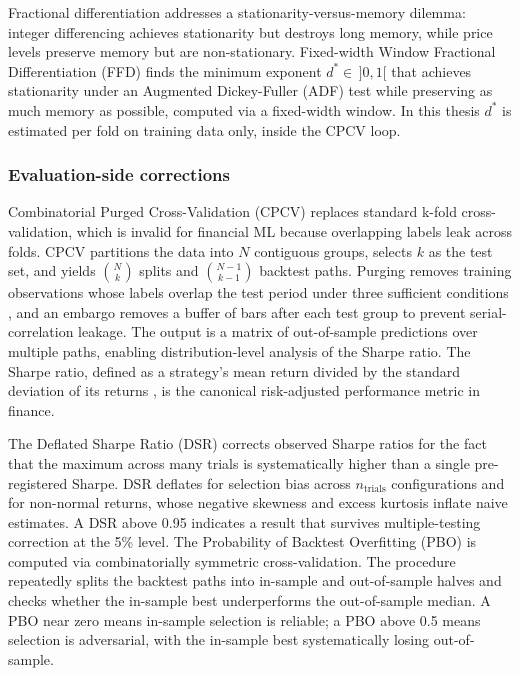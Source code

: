 Fractional differentiation addresses a stationarity-versus-memory dilemma: integer differencing achieves stationarity but destroys long memory, while price levels preserve memory but are non-stationary. Fixed-width Window Fractional Differentiation (FFD) finds the minimum exponent $d^* \in \,]0, 1[$ that achieves stationarity under an Augmented Dickey-Fuller (ADF) test while preserving as much memory as possible, computed via a fixed-width window. In this thesis $d^*$ is estimated per fold on training data only, inside the CPCV loop.


\subsubsection{Evaluation-side corrections}\label{subsubsec:afml_eval_side}

Combinatorial Purged Cross-Validation (CPCV) replaces standard k-fold cross-validation, which is invalid for financial ML because overlapping labels leak across folds. CPCV partitions the data into $N$ contiguous groups, selects $k$ as the test set, and yields $\binom{N}{k}$ splits and $\binom{N-1}{k-1}$ backtest paths. Purging removes training observations whose labels overlap the test period under three sufficient conditions \citep[Ch.~7]{lopez_de_prado_2018}, and an embargo removes a buffer of bars after each test group to prevent serial-correlation leakage. The output is a matrix of out-of-sample predictions over multiple paths, enabling distribution-level analysis of the Sharpe ratio. The Sharpe ratio, defined as a strategy's mean return divided by the standard deviation of its returns \citep{sharpe_1966}, is the canonical risk-adjusted performance metric in finance.

The Deflated Sharpe Ratio (DSR) corrects observed Sharpe ratios for the fact that the maximum across many trials is systematically higher than a single pre-registered Sharpe. DSR deflates for selection bias across $n_{\text{trials}}$ configurations and for non-normal returns, whose negative skewness and excess kurtosis inflate naive estimates. A DSR above 0.95 indicates a result that survives multiple-testing correction at the 5\% level. The Probability of Backtest Overfitting (PBO) is computed via combinatorially symmetric cross-validation. The procedure repeatedly splits the backtest paths into in-sample and out-of-sample halves and checks whether the in-sample best underperforms the out-of-sample median. A PBO near zero means in-sample selection is reliable; a PBO above 0.5 means selection is adversarial, with the in-sample best systematically losing out-of-sample.


